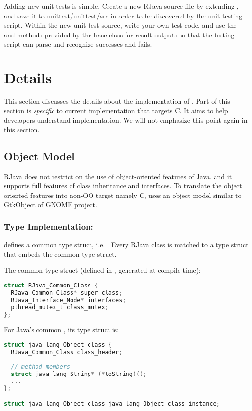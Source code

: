 \documentclass[12pt]{article}
\begin{document}
Adding new unit tests is simple. Create a new RJava source file by
extending , and save it to
unittest/unittest/src in order to be discovered by the unit testing script. 
Within the new unit test source, write your own test code, and use 
the  and  methods provided
by the base class for result outputs so that the testing
script can parse and recognize successes and fails. 

\clearpage

\section{\rjcfull Details}

This section discusses the details about the implementation of \rjcfull. 
Part of this section is \emph{specific} to current \rjc implementation 
that targets C. It aims to help developers understand
\rjc implementation. We will not emphasize this point again in 
this section. 

\subsection{\rjc Object Model}

RJava does not restrict on the use of object-oriented features of
Java, and it supports full features of class inheritance and 
interfaces. To translate the object oriented features into
non-OO target namely C, \rjc uses an object model 
similar to GtkObject of GNOME project. 

\subsubsection{Type Implementation: }
\rjc defines a common type struct, i.e. . Every
RJava class is matched to a type struct that embeds the common type struct. 

The common type struct (defined in , generated at compile-time):
\begin{lstlisting}[language=c]
struct RJava_Common_Class {
  RJava_Common_Class* super_class;
  RJava_Interface_Node* interfaces;
  pthread_mutex_t class_mutex;
};
\end{lstlisting}

For Java's common , its type struct is:
\begin{lstlisting}[language=c]
struct java_lang_Object_class {
  RJava_Common_Class class_header;
    
  // method members
  struct java_lang_String* (*toString)();
  ...
};

struct java_lang_Object_class java_lang_Object_class_instance;
\end{lstlisting}
\end{document}
